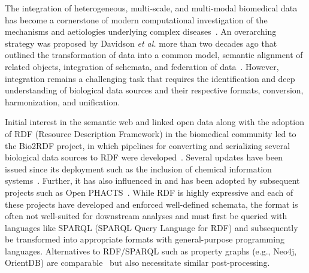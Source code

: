 The integration of heterogeneous, multi-scale, and multi-modal biomedical data has become a cornerstone of modern computational investigation of the mechanisms and aetiologies underlying complex diseases~\cite{VanDam2014,Iyappan2016,Wanichthanarak2015,Himmelstein2017,Fan2019}.
An overarching strategy was proposed by Davidson \textit{et al.} more than two decades ago that outlined the transformation of data into a common model, semantic alignment of related objects, integration of schemata, and federation of data~\cite{Davidson1995}.
However, integration remains a challenging task that requires the identification and deep understanding of biological data sources and their respective formats, conversion, harmonization, and unification.

Initial interest in the semantic web and linked open data along with the adoption of RDF (Resource Description Framework) in the biomedical community led to the Bio2RDF project, in which pipelines for converting and serializing several biological data sources to RDF were developed~\cite{Belleau2008}.
Several updates have been issued since its deployment such as the inclusion of chemical information systems~\cite{Chen2010}.
Further, it has also influenced in and has been adopted by subsequent projects such as Open PHACTS~\cite{Williams2012}.
While RDF is highly expressive and each of these projects have developed and enforced well-defined schemata, the format is often not well-suited for downstream analyses and must first be queried with languages like SPARQL (SPARQL Query Language for RDF) and subsequently be transformed into appropriate formats with general-purpose programming languages.
Alternatives to RDF/SPARQL such as property graphs (e.g., Neo4j, OrientDB) are comparable~\cite{Alocci2015} but also necessitate similar post-processing.


